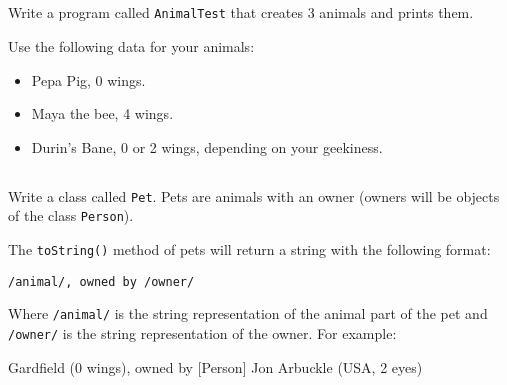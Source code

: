 \documentclass[a4paper, 11pt]{article}
\begin{document}
\subsection{}

Write a program called \verb+AnimalTest+ that creates 3 animals and prints
them.

Use the following data for your animals:

\begin{itemize}

  \item Pepa Pig, 0 wings.

  \item Maya the bee, 4 wings.

  \item Durin's Bane, 0 or 2 wings, depending on your geekiness.

\end{itemize}












\subsection{}

Write a class called \verb+Pet+. Pets are animals with an owner (owners will be
objects of the class \verb+Person+).

The \verb+toString()+ method of pets will return a string with the following
format:

\verb+/animal/, owned by /owner/+

Where \verb+/animal/+ is the string representation of the animal part of the
pet and \verb+/owner/+ is the string representation of the owner. For example:

\begin{cmd}
[Animal] Gardfield (0 wings), owned by [Person] Jon Arbuckle (USA, 2 eyes)
\end{cmd}


\subsection{}
\end{document}
